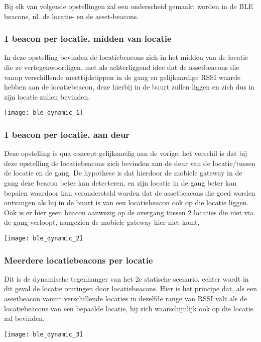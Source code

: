 Bij elk van volgende opstellingen zal een onderscheid gemaakt worden in de BLE beacons, nl. de locatie- en de asset-beacons.

\subsubsection{1 beacon per locatie, midden van locatie}
\begin{minipage}{0.65\textwidth}
In deze opstelling bevinden de locatiebeacons zich in het midden van de locatie die ze vertegenwoordigen, met als achterliggend idee dat de assetbeacons die vanop verschillende meettijdstippen in de gang en gelijkaardige RSSI waarde hebben aan de locatiebeacon, deze hierbij in de buurt zullen liggen en zich dus in zijn locatie zullen bevinden.
\end{minipage}
\hfill
\begin{minipage}{0.30\textwidth}
	\texttt{[image: ble\_dynamic\_1]}
\end{minipage}

\subsubsection{1 beacon per locatie, aan deur}
\begin{minipage}{0.65\textwidth}
Deze opstelling is qua concept gelijkaardig aan de vorige, het verschil is dat bij deze opstelling de locatiebeacons zich bevinden aan de deur van de locatie/tussen de locatie en de gang. De hypothese is dat hierdoor de mobiele gateway in de gang deze beacon beter kan detecteren, en zijn locatie in de gang beter kan bepalen waardoor kan verondersteld worden dat de assetbeacons die goed worden ontvangen als hij in de buurt is van een locatiebeacon ook op die locatie liggen. Ook is er hier geen beacon aanwezig op de overgang tussen 2 locaties die niet via de gang verloopt, aangezien de mobiele gateway hier niet komt.
\end{minipage}
\hfill
\begin{minipage}{0.30\textwidth}
	\texttt{[image: ble\_dynamic\_2]}
\end{minipage}

\subsubsection{Meerdere locatiebeacons per locatie}
\begin{minipage}{0.65\textwidth}
Dit is de dynamische tegenhanger van het 2e statische scenario, echter wordt in dit geval de locatie omringen door locatiebeacons. Hier is het principe dat, als een assetbeacon vanuit verschillende locaties in dezelfde range van RSSI valt als de locatiebeacons van een bepaalde locatie, hij zich waarschijnlijk ook op die locatie zal bevinden.
\end{minipage}
\hfill
\begin{minipage}{0.30\textwidth}
	\texttt{[image: ble\_dynamic\_3]}
\end{minipage}


